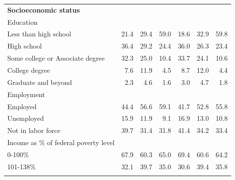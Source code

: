 \begin{landscape}
\begin{ThreePartTable}
\begin{longtable}[t]{lrrrrrr}
\multicolumn{7}{l}{\textbf{Socioeconomic status}}\\
\hspace{1em}Education &  &  &  &  &  & \\
\hspace{1em}\hspace{1em}Less than high school & 21.4 & 29.4 & 59.0 & 18.6 & 32.9 & 59.8\\
\hspace{1em}\hspace{1em}High school & 36.4 & 29.2 & 24.4 & 36.0 & 26.3 & 23.4\\
\hspace{1em}\hspace{1em}Some college or Associate degree & 32.3 & 25.0 & 10.4 & 33.7 & 24.1 & 10.6\\
\hspace{1em}\hspace{1em}College degree & 7.6 & 11.9 & 4.5 & 8.7 & 12.0 & 4.4\\
\hspace{1em}\hspace{1em}Graduate and beyond & 2.3 & 4.6 & 1.6 & 3.0 & 4.7 & 1.8\\
\hspace{1em}Employment &  &  &  &  &  & \\
\hspace{1em}\hspace{1em}Employed & 44.4 & 56.6 & 59.1 & 41.7 & 52.8 & 55.8\\
\hspace{1em}\hspace{1em}Unemployed & 15.9 & 11.9 & 9.1 & 16.9 & 13.0 & 10.8\\
\hspace{1em}\hspace{1em}Not in labor force & 39.7 & 31.4 & 31.8 & 41.4 & 34.2 & 33.4\\
\hspace{1em}Income as \% of federal poverty level &  &  &  &  &  & \\
\hspace{1em}\hspace{1em}0-100\% & 67.9 & 60.3 & 65.0 & 69.4 & 60.6 & 64.2\\
\hspace{1em}\hspace{1em}101-138\% & 32.1 & 39.7 & 35.0 & 30.6 & 39.4 & 35.8\\
\addlinespace[0.3em]
\multicolumn{7}{l}{\textbf{Immigrant characteristics}}\\

\end{longtable}
\end{ThreePartTable}
\end{landscape}
